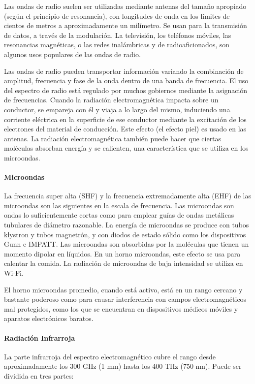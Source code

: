 \documentclass[12pt]{article}
\begin{document}
Las ondas de radio suelen ser utilizadas mediante antenas del tama\~no apropiado (seg\'un el principio de resonancia), con longitudes de onda en los l\'imites de cientos de metros a aproximadamente un mil\'imetro. Se usan para la transmisi\'on de datos, a trav\'es de la modulaci\'on. La televisi\'on, los tel\'efonos m\'oviles, las resonancias magn\'eticas, o las redes inal\'ambricas y de radioaficionados, son algunos usos populares de las ondas de radio.
\vspace{0.4cm}

Las ondas de radio pueden transportar informaci\'on variando la combinaci\'on de amplitud, frecuencia y fase de la onda dentro de una banda de frecuencia. El uso del espectro de radio est\'a regulado por muchos gobiernos mediante la asignaci\'on de frecuencias. Cuando la radiaci\'on electromagn\'etica impacta sobre un conductor, se empareja con \'el y viaja a lo largo del mismo, induciendo una corriente el\'ectrica en la superficie de ese conductor mediante la excitaci\'on de los electrones del material de conducci\'on. Este efecto (el efecto piel) es usado en las antenas. La radiaci\'on electromagn\'etica tambi\'en puede hacer que ciertas mol\'eculas absorban energ\'ia y se calienten, una caracter\'istica que se utiliza en los microondas.

\paragraph{Microondas}
La frecuencia super alta (SHF) y la frecuencia extremadamente alta (EHF) de las microondas son las siguientes en la escala de frecuencia. Las microondas son ondas lo suficientemente cortas como para emplear gu\'ias de ondas met\'alicas tubulares de di\'ametro razonable. La energ\'ia de microondas se produce con tubos klystron y tubos magnetr\'on, y con diodos de estado s\'olido como los dispositivos Gunn e IMPATT. Las microondas son absorbidas por la mol\'eculas que tienen un momento dipolar en l\'iquidos. En un horno microondas, este efecto se usa para calentar la comida. La radiaci\'on de microondas de baja intensidad se utiliza en Wi-Fi.
\vspace{0.4cm}

El horno microondas promedio, cuando est\'a activo, est\'a en un rango cercano y bastante poderoso como para causar interferencia con campos electromagn\'eticos mal protegidos, como los que se encuentran en dispositivos m\'edicos m\'oviles y aparatos electr\'onicos baratos.

\paragraph{Radiaci\'on Infrarroja}
La parte infrarroja del espectro electromagn\'etico cubre el rango desde aproximadamente los 300 GHz (1 mm) hasta los 400 THz (750 nm). Puede ser dividida en tres partes:
\end{document}
